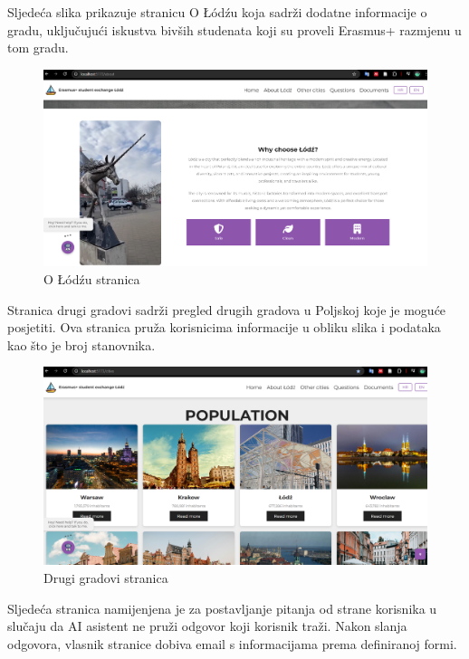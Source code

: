 \documentclass[]{foi}
\begin{document}
\newpage

Sljedeća slika prikazuje stranicu O Łódźu koja sadrži dodatne informacije o gradu, uključujući iskustva bivših studenata koji su proveli
Erasmus+ razmjenu u tom gradu.

\begin{figure}[ht]
  \centering
  \includegraphics[width=1\textwidth]{./assets/about.png}
  \caption{O Łódźu stranica}
  \label{fig:slika95}
\end{figure}

Stranica drugi gradovi sadrži pregled drugih gradova u Poljskoj koje je moguće posjetiti. Ova stranica pruža korisnicima
informacije u obliku slika i podataka kao što je broj stanovnika.

\begin{figure}[ht]
  \centering
  \includegraphics[width=1\textwidth]{./assets/other.png}
  \caption{Drugi gradovi stranica}
  \label{fig:slika96}
\end{figure}

\newpage
Sljedeća stranica namijenjena je za postavljanje pitanja od strane korisnika u slučaju da AI asistent ne pruži odgovor koji korisnik traži.
Nakon slanja odgovora, vlasnik stranice dobiva email s informacijama prema definiranoj formi.
\end{document}

